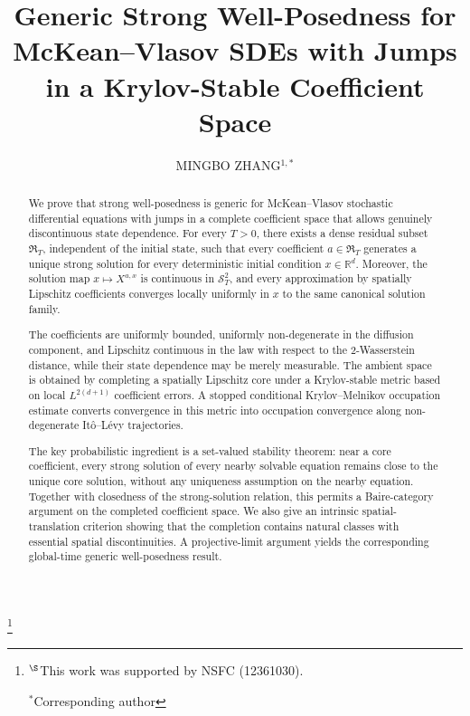 \documentclass[12pt,oneside, reqno]{amsart}
\numberwithin{equation}{section}
\begin{document}
	\title{Generic Strong Well-Posedness for McKean--Vlasov SDEs with Jumps in a Krylov-Stable Coefficient Space}
	\date{}
	\author{ MINGBO ZHANG${}^{1,\ast}$}
	
	
	\footnote[0]{$^{\S}$This work was supported by NSFC (12361030).
		
		${}^\ast$Corresponding author}
	
	
	\date{}
	
	
	\begin{abstract}
		We prove that strong well-posedness is generic for McKean--Vlasov
		stochastic differential equations with jumps in a complete coefficient
		space that allows genuinely discontinuous state dependence. For every
		$T>0$, there exists a dense residual subset $\mathfrak R_T$, independent
		of the initial state, such that every coefficient $a\in\mathfrak R_T$
		generates a unique strong solution for every deterministic initial
		condition $x\in\mathbb R^d$. Moreover, the solution map
		$x\mapsto X^{a,x}$ is continuous in $\mathcal S_T^2$, and every
		approximation by spatially Lipschitz coefficients converges locally
		uniformly in $x$ to the same canonical solution family.
		
		The coefficients are uniformly bounded, uniformly non-degenerate in the
		diffusion component, and Lipschitz continuous in the law with respect to
		the $2$-Wasserstein distance, while their state dependence may be merely
		measurable. The ambient space is obtained by completing a spatially
		Lipschitz core under a Krylov-stable metric based on local
		$L^{2(d+1)}$ coefficient errors. A stopped conditional
		Krylov--Melnikov occupation estimate converts convergence in this metric
		into occupation convergence along non-degenerate It\^o--L\'evy
		trajectories.
		
		The key probabilistic ingredient is a set-valued stability theorem: near
		a core coefficient, every strong solution of every nearby solvable
		equation remains close to the unique core solution, without any
		uniqueness assumption on the nearby equation. Together with closedness
		of the strong-solution relation, this permits a Baire-category argument
		on the completed coefficient space. We also give an intrinsic
		spatial-translation criterion showing that the completion contains
		natural classes with essential spatial discontinuities. A projective-limit
		argument yields the corresponding global-time generic well-posedness
		result.
	\end{abstract}
	
\end{document}
